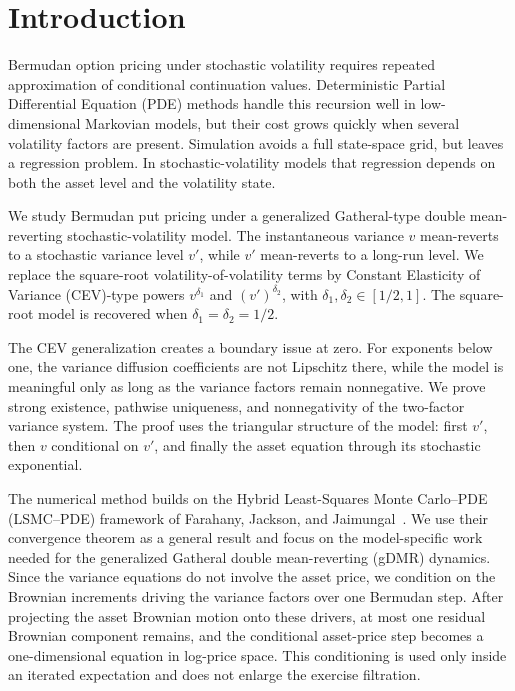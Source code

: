 \documentclass[pdflatex,sn-mathphys-num]{sn-jnl}
\theoremstyle{thmstyleone}%
\theoremstyle{thmstylethree}%
\theoremstyle{thmstyletwo}%
\begin{document}
\section{Introduction}

Bermudan option pricing under stochastic volatility requires repeated
approximation of conditional continuation values. Deterministic Partial
Differential Equation (PDE) methods handle this recursion well in
low-dimensional Markovian models, but their cost grows quickly when several
volatility factors are present. Simulation avoids a full state-space grid, but
leaves a regression problem. In stochastic-volatility models that
regression depends on both the asset level and the volatility state.

We study Bermudan put pricing under a generalized Gatheral-type double
mean-reverting stochastic-volatility model. The instantaneous variance $v$
mean-reverts to a stochastic variance level $v'$, while $v'$ mean-reverts to a
long-run level. We replace the square-root volatility-of-volatility terms by
Constant Elasticity of Variance (CEV)-type powers $v^{\delta_1}$ and
$(v')^{\delta_2}$, with
$\delta_1,\delta_2\in[1/2,1]$. The square-root model is recovered when
$\delta_1=\delta_2=1/2$.

The CEV generalization creates a boundary issue at zero. For exponents below
one, the variance diffusion coefficients are not Lipschitz there, while the
model is meaningful only as long as the variance factors remain nonnegative. We
prove strong existence, pathwise uniqueness, and nonnegativity of the
two-factor variance system. The proof uses
the triangular structure of the model: first $v'$, then $v$ conditional on
$v'$, and finally the asset equation through its stochastic exponential.

The numerical method builds on the Hybrid Least-Squares Monte Carlo--PDE
(LSMC--PDE) framework of Farahany, Jackson, and
Jaimungal~\cite{farahany2020mixing}. We use their convergence
theorem as a general result and focus on the model-specific work needed for the
generalized Gatheral double mean-reverting (gDMR) dynamics. Since the variance
equations do not involve the asset price, we condition on the Brownian
increments driving the variance factors over one Bermudan step. After
projecting the asset Brownian motion onto these drivers, at most one residual
Brownian component remains, and the conditional asset-price step becomes a
one-dimensional equation in log-price space. This
conditioning is used only inside an iterated expectation and does not enlarge
the exercise filtration.
\end{document}
